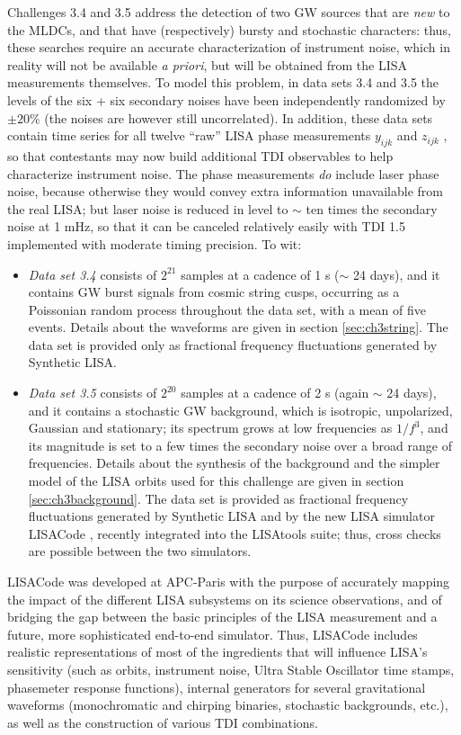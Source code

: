 \documentclass{iopart}
\begin{document}
Challenges 3.4 and 3.5 address the detection of two GW sources that are \emph{new} to the MLDCs, and that have (respectively) bursty and stochastic characters: thus, these searches require an accurate characterization of instrument noise, which in reality will not be available \emph{a priori}, but will be obtained from the LISA measurements themselves.
To model this problem, in data sets 3.4 and 3.5 the levels of the six + six secondary noises have been independently randomized by $\pm 20 \%$ (the noises are however still uncorrelated). In addition, these data sets contain time series for all twelve ``raw'' LISA phase measurements $y_{ijk}$ and $z_{ijk}$ \cite{synthlisa}, so that contestants may now build additional TDI observables to help characterize instrument noise. The phase measurements \emph{do} include laser phase noise, because otherwise they would convey extra information unavailable from the real LISA; but laser noise is reduced in level to $\sim$ ten times the secondary noise at 1 mHz, so that it can be canceled relatively easily with TDI 1.5 implemented with moderate timing precision.
To wit:
%
\begin{itemize}
%
\item \textit{Data set 3.4} consists of $2^{21}$ samples at a cadence of 1 s ($\sim$ 24 days), and it contains GW burst signals from cosmic string cusps, occurring as a Poissonian random process throughout the data set, with a mean of five events. Details about the waveforms are given in section \ref{sec:ch3string}. The data set is provided only as fractional frequency fluctuations generated by Synthetic LISA.
%
\item \textit{Data set 3.5} consists of $2^{20}$ samples at a cadence of 2 s (again $\sim$ 24 days), and it contains a stochastic GW background, which is isotropic, unpolarized, Gaussian and stationary; its spectrum grows at low frequencies as $1/f^3$, and its magnitude is set to a few times the secondary noise over a broad range of frequencies. Details about the synthesis of the background and the simpler model of the LISA orbits used for this challenge are given in section \ref{sec:ch3background}. The data set is provided as fractional frequency fluctuations generated by Synthetic LISA and by the new LISA simulator LISACode \cite{lisacode}, recently integrated into the LISAtools suite; thus, cross checks are possible between the two simulators.
%
\end{itemize}
%
LISACode was developed at APC-Paris with the purpose of accurately mapping the impact of the different LISA subsystems on its science observations, and of bridging the gap between the basic principles of the LISA measurement and a future, more sophisticated end-to-end simulator. Thus, LISACode includes realistic representations of most of the ingredients that will influence LISA's sensitivity (such as orbits, instrument noise, Ultra Stable Oscillator time stamps, phasemeter response functions), internal generators for several gravitational waveforms (monochromatic and chirping binaries, stochastic backgrounds, etc.), as well as the construction of various TDI combinations.
\end{document}
